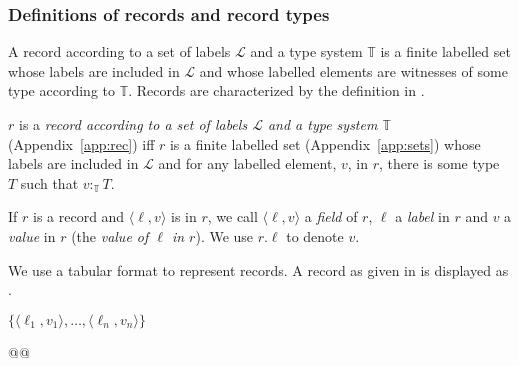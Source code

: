 \subsubsection{Definitions of records and record types}
\label{sec:recs-rectypes}
A record according to a set of labels $\mathcal{L}$ and a type
system $\mathbb{T}$   is a
finite labelled set 
whose labels are included in $\mathcal{L}$ and whose labelled elements
are witnesses of some type according to $\mathbb{T}$.
Records are characterized by the definition in \nexteg{}.
\begin{ex} 
$r$ is a \textit{record according to a set of labels $\mathcal{L}$ and a type
system $\mathbb{T}$} (Appendix~\ref{app:rec}) iff $r$ is a finite labelled set
(Appendix~\ref{app:sets}) whose labels are included in $\mathcal{L}$
and for any labelled element, $v$, in $r$, there is some type $T$ such
that $v:_{\mathbb{T}}T$.
\label{ex:records} 
\end{ex} 
If $r$ is a record and $\langle\ell,v\rangle$
is in $r$, we call $\langle\ell,v\rangle$ a \textit{field} of $r$,
$\ell$ a {\it label\/} in $r$ and $v$ a {\it value\/} in $r$ (the
\textit{value of $\ell$ in $r$}).
We use $r.\ell$ to denote $v$.  

We use a tabular format to
represent records.  A record as given in  
 is displayed as .
\begin{ex} 
\begin{subex} 
 
\item $\{\langle\ell_1,v_1\rangle,\ldots,\langle\ell_n,v_n\rangle\}$ 
 
\item {} 
 
\end{subex} 
   
\end{ex} 

 
@@ 



